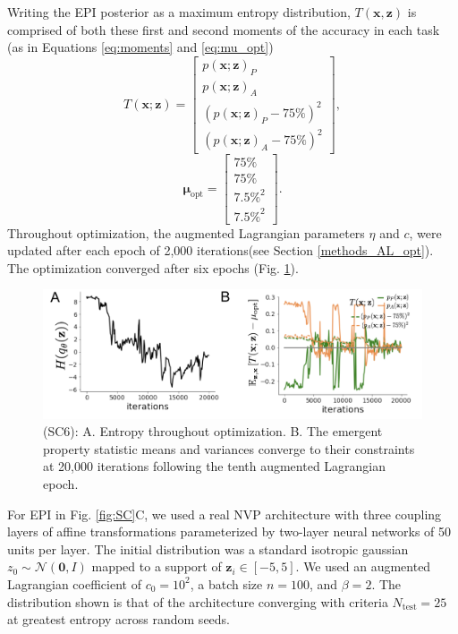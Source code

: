 \documentclass[11pt]{article}
\begin{document}
Writing the EPI posterior as a maximum entropy distribution, $T(\mathbf{x}, \mathbf{z})$ is comprised of both these first and second moments of the accuracy in each task (as in Equations \ref{eq:moments} and \ref{eq:mu_opt})
\begin{equation} 
T(\mathbf{x}; \mathbf{z}) = \begin{bmatrix} p(\mathbf{x}; \mathbf{z})_P \\ p(\mathbf{x}; \mathbf{z})_A \\ \left(p(\mathbf{x}; \mathbf{z})_P - 75\% \right)^2 \\ \left(p(\mathbf{x}; \mathbf{z})_A - 75\% \right)^2 \end{bmatrix},
\end{equation}
\begin{equation} 
\bm{\mu}_{\text{opt}} = \begin{bmatrix} 75\% \\ 75\% \\ 7.5\%^2 \\ 7.5\%^2 \end{bmatrix}.
\end{equation}
Throughout optimization, the augmented Lagrangian parameters $\eta$ and $c$, were updated after each epoch of 2,000 iterations(see Section \ref{methods_AL_opt}).  
The optimization converged after six epochs (Fig. \ref{fig:SC5}).


\begin{figure}
\begin{center}
\includegraphics[scale=0.5]{figures/figSC6/figSC6.pdf}
\end{center}
\caption{\small (SC6): 
A. Entropy throughout optimization. 
B. The emergent property statistic means and variances converge to their constraints at 20,000 iterations following the tenth augmented Lagrangian epoch.
}
\label{fig:SC5}
\end{figure}

For EPI in Fig. \ref{fig:SC}C, we used a real NVP architecture with three coupling layers of affine transformations parameterized by two-layer neural networks of 50 units per layer.
The initial distribution was a standard isotropic gaussian $z_0 \sim \mathcal{N}(\mathbf{0}, I)$ mapped to a support of $\mathbf{z}_i \in [-5, 5]$. 
We used an augmented Lagrangian coefficient of $c_0 = 10^{2}$, a batch size $n=100$, and $\beta=2$.
The distribution shown is that of the architecture converging with criteria $N_{\text{test}} = 25$ at greatest entropy across random seeds.
\end{document}
